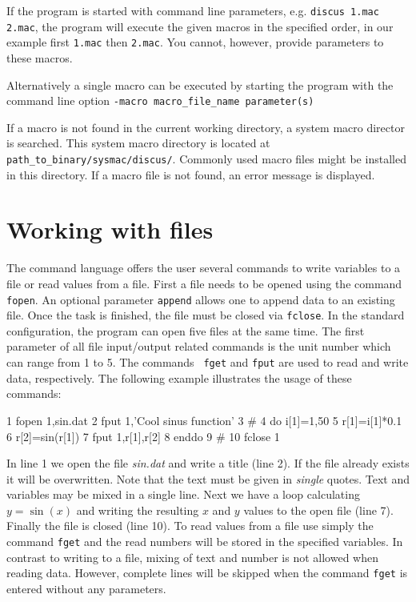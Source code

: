 If the program is started with command line parameters,
e.g. {\tt discus 1.mac 2.mac}, the program will execute the given
macros in the specified order, in our example first {\tt 1.mac} then
{\tt 2.mac}. You cannot, however, provide parameters to these macros.

Alternatively a single macro can be executed by starting the program
with the command line option 
{\tt -macro macro\_file\_name parameter(s)}

If a macro is not found in the current working
directory, a system macro director is searched. This system macro
directory is located at {\tt path\_to\_binary/sysmac/discus/}.
Commonly used macro files might be installed in this directory.
If a macro file is not found, an error message is displayed.


\section{Working with files \label{io}}

The command language offers the user several commands to write
variables to a file or read values from a file. First a file needs
to be opened using the command {\tt fopen}. An optional parameter
{\tt append} allows one to append data to an existing file. Once the
task is finished, the file must be closed via {\tt fclose}. In the
standard configuration, the program can open five files at the same
time. The first parameter of all file input/output related commands
is the unit number which can range from 1 to 5. The commands {\tt
fget} and {\tt fput} are used to read and write data, respectively.
The following example illustrates the usage of these commands:

\footnotesize
\begin{MacVerbatim}
      1  fopen 1,sin.dat
      2  fput 1,'Cool sinus function'
      3  #
      4  do i[1]=1,50
      5     r[1]=i[1]*0.1
      6     r[2]=sin(r[1])
      7     fput 1,r[1],r[2]
      8  enddo
      9  #
     10  fclose 1
\end{MacVerbatim}
\normalsize

In line 1 we open the file {\it sin.dat} and write a title (line 2).
If the file already exists it will be overwritten. Note that the
text must be given in {\it single} quotes. Text and variables may be
mixed in a single line. Next we have a loop calculating $y=\sin(x)$
and writing the resulting $x$ and $y$ values to the open file (line
7). Finally the file is closed (line 10). To read values from a file
use simply the command {\tt fget} and the read numbers will be
stored in the specified variables. In contrast to writing to a file,
mixing of text and number is not allowed when reading data. However,
complete lines will be skipped when the command {\tt fget} is
entered without any parameters.


